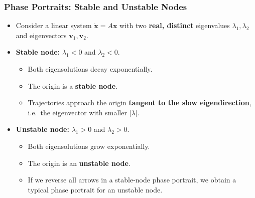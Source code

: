 \documentclass{beamer}
\begin{document}
\begin{frame}
  \frametitle{Phase Portraits: Stable and Unstable Nodes}

  \begin{itemize}
    \item Consider a linear system $\dot{\mathbf{x}} = A\mathbf{x}$ with
      two \textbf{real, distinct} eigenvalues $\lambda_1,\lambda_2$ and
      eigenvectors $\mathbf{v}_1,\mathbf{v}_2$.
    \item \textbf{Stable node:} $\lambda_1<0$ and $\lambda_2<0$.
      \begin{itemize}
        \item Both eigensolutions decay exponentially.
        \item The origin is a \textbf{stable node}.
        \item Trajectories approach the origin \textbf{tangent to the slow
          eigendirection}, i.e.\ the eigenvector with smaller $|\lambda|$.
      \end{itemize}
    \item \textbf{Unstable node:} $\lambda_1>0$ and $\lambda_2>0$.
      \begin{itemize}
        \item Both eigensolutions grow exponentially.
        \item The origin is an \textbf{unstable node}.
        \item If we reverse all arrows in a stable-node phase portrait,
          we obtain a typical phase portrait for an unstable node.
      \end{itemize}
  \end{itemize}
\end{frame}
\end{document}
